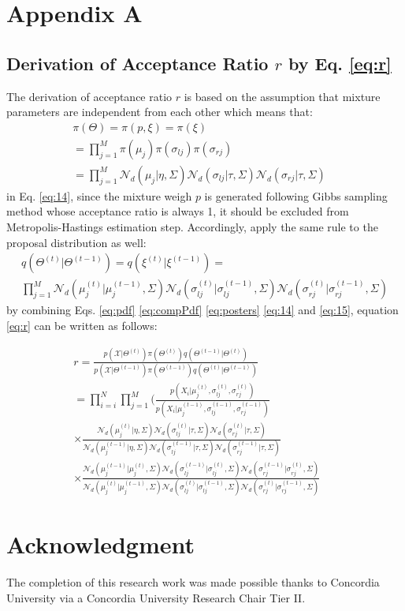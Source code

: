 \documentclass[conference]{IEEEtran}
\begin{document}
\section*{Appendix A}
\subsection{Derivation of Acceptance Ratio $r$ by Eq. \eqref{eq:r}}
The derivation of acceptance ratio $r$ is based on the assumption that mixture parameters are independent from each other which means that:
\bigskip
\begin{multline}
\pi(\Theta) = \pi(p,\xi) = \pi(\xi) \\
= \prod_{j=1}^M\pi(\mu_j)\pi(\sigma_{lj})\pi(\sigma_{rj}) \qquad\qquad\qquad\qquad\\
= \prod_{j=1}^M\mathcal{N}_d(\mu_j|\eta,\Sigma)\mathcal{N}_d(\sigma_{lj}|\tau,\Sigma)\mathcal{N}_d(\sigma_{rj}|\tau,\Sigma)\quad
\label{eq:14}
\end{multline}
in Eq. \eqref{eq:14}, since the mixture weigh $p$ is generated following Gibbs sampling method whose acceptance ratio is always 1, it should be excluded from Metropolis-Hastings estimation step. Accordingly, apply the same rule to the proposal distribution as well:
\begin{multline}
q(\Theta^{(t)}|\Theta^{(t-1)}) = q(\xi^{(t)}|\xi^{(t-1)})= \\
\prod_{j=1}^M\mathcal{N}_d(\mu_j^{(t)}|\mu_j^{(t-1)},\Sigma)\mathcal{N}_d(\sigma_{lj}^{(t)}|\sigma_{lj}^{(t-1)},\Sigma)\mathcal{N}_d(\sigma_{rj}^{(t)}|\sigma_{rj}^{(t-1)},\Sigma)
\label{eq:15}
\end{multline}
by combining Eqs. \eqref{eq:pdf} \eqref{eq:compPdf} \eqref{eq:posters} \eqref{eq:14} and \eqref{eq:15}, equation \eqref{eq:r} can be written as follows:

\begin{multline}
r = \frac{p(\mathcal{X}|\Theta^{(t)})\pi(\Theta^{(t)})q(\Theta^{(t-1)}|\Theta^{(t)})}{p(\mathcal{X}|\Theta^{(t-1)})\pi(\Theta^{(t-1)})q(\Theta^{(t)}|\Theta^{(t-1)})} \\
= \prod_{i=i}^N \prod_{j=1}^M(\frac{p(X_i|\mu_j^{(t)},\sigma_{lj}^{(t)},\sigma_{rj}^{(t)})}
{p(X_i|\mu_j^{(t-1)},\sigma_{lj}^{(t-1)},\sigma_{rj}^{(t-1)})} \qquad\qquad\qquad\\
\times \frac{\mathcal{N}_d(\mu_j^{(t)}|\eta,\Sigma)\mathcal{N}_d(\sigma_{lj}^{(t)}|\tau,\Sigma)\mathcal{N}_d(\sigma_{rj}^{(t)}|\tau,\Sigma)}{\mathcal{N}_d(\mu_j^{(t-1)}|\eta,\Sigma)\mathcal{N}_d(\sigma_{lj}^{(t-1)}|\tau,\Sigma)\mathcal{N}_d(\sigma_{rj}^{(t-1)}|\tau,\Sigma)} \quad\\
\times \frac{\mathcal{N}_d(\mu_j^{(t-1)}|\mu_j^{(t)},\Sigma)\mathcal{N}_d(\sigma_{lj}^{(t-1)}|\sigma_{lj}^{(t)},\Sigma)\mathcal{N}_d(\sigma_{rj}^{(t-1)}|\sigma_{rj}^{(t)},\Sigma)}{\mathcal{N}_d(\mu_j^{(t)}|\mu_j^{(t-1)},\Sigma)\mathcal{N}_d(\sigma_{lj}^{(t)}|\sigma_{lj}^{(t-1)},\Sigma)\mathcal{N}_d(\sigma_{rj}^{(t)}|\sigma_{rj}^{(t-1)},\Sigma)}
\label{eq:16}
\end{multline}

\section*{Acknowledgment}
The completion of this research work was made possible thanks to Concordia University via a Concordia University Research Chair Tier II.



\end{document}
